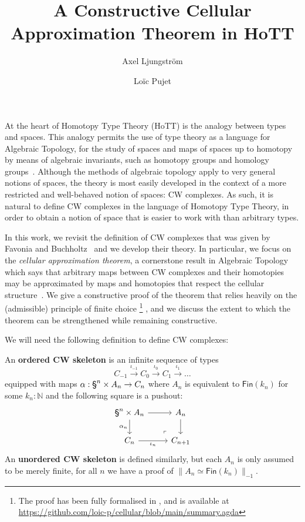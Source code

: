 \documentclass{easychair}
\title{A Constructive Cellular Approximation Theorem in HoTT}
\author{
Axel Ljungström \and Loïc Pujet}
\institute{
  {
  Stockholm University,
  Stockholm, Sweden
  }
 }
\begin{document}
\maketitle

At the heart of Homotopy Type Theory (HoTT) is the analogy between types and spaces.
%
This analogy permits the use of type theory as a language for Algebraic Topology, \ie for the study
of spaces and maps of spaces up to homotopy by means of algebraic invariants, such as homotopy groups
and homology groups~\cite{HoTT13}.
%
Although the methods of algebraic topology apply to very general notions of spaces, the theory is
most easily developed in the context of a more restricted and well-behaved notion of spaces:
CW complexes.
%
As such, it is natural to define CW complexes in the language of Homotopy Type Theory,
in order to obtain a notion of space that is easier to work with than arbitrary types.

In this work, we revisit the definition of CW complexes that was given by Favonia and
Buchholtz~\cite{BuchholtzFavonia18} and we develop their theory.
%
In particular, we focus on the \emph{cellular approximation theorem}, a cornerstone result in
Algebraic Topology which says that arbitrary maps between CW complexes and their homotopies may be
approximated by maps and homotopies that respect the cellular structure~\cite[chap. 10]{May1999}.
%
We give a constructive proof of the theorem that relies heavily on the (admissible) principle of
finite choice%
\footnote{The proof has been fully formalised in \CubicalAgda, and is available at \url{https://github.com/loic-p/cellular/blob/main/summary.agda}}%
, and we discuss the extent to which the theorem can be strengthened while remaining constructive.

We will need the following definition to define CW complexes:

\begin{definition}[CW skeleta]
  An \textbf{ordered CW skeleton} is an infinite sequence of types $$C_{-1} \xrightarrow{\iota_{-1}} C_0 \xrightarrow{\iota_{0}} C_1 \xrightarrow{\iota_{1}} \dots$$
  equipped with maps $\alpha : \sphere{n} \times A_n \to C_n$ where $A_n$ is equivalent to $\mathsf{Fin}(k_n)$ for some $k_n : \mathbb{N}$ and the following square is a pushout:
  \[
\begin{tikzcd}[ampersand replacement=\&]
	{\sphere{n} \times A_n} \& {A_n} \\
	{C_n} \& {C_{n+1}}
	\arrow[from=1-1, to=1-2]
	\arrow["{\alpha_n}"', from=1-1, to=2-1]
	\arrow["{\iota_n}"', from=2-1, to=2-2]
	\arrow[from=1-2, to=2-2]
	\arrow["\lrcorner"{anchor=center, pos=0.125, rotate=180}, draw=none, from=2-2, to=1-1]
\end{tikzcd}
\]
An \textbf{unordered CW skeleton} is defined similarly, but each $A_n$ is only assumed to be merely
finite, \ie for all \( n \) we have a proof of \( \| A_n \simeq \mathsf{Fin}(k_n) \|_{-1} \).
\end{definition}
\end{document}
